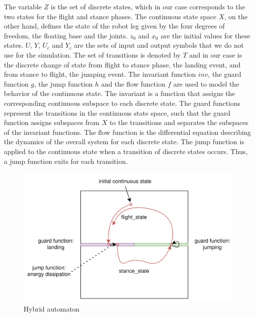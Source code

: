 \documentclass[10pt,conference]{IEEEtran}
\begin{document}
The variable $Z$ is the set of discrete states, which in our case corresponds to the two states for the flight and stance phases. The continuous state space $X$, on the other hand, defines the state of the robot leg given by the four degrees of freedom, the floating base and the joints. $z_0$ and $x_0$ are the initial values for these states. $U$, $Y$, $U_c$ and $Y_c$ are the sets of input and output symbols that we do not use for the simulation. The set of transitions is denoted by $T$ and in our case is the discrete change of state from flight to stance phase, the landing event, and  from stance to flight, the jumping event. The invariant function $inv$, the guard function $g$, the jump function $h$ and the flow function $f$ are used to model the behavior of the continuous state. The invariant is a function that assigns the corresponding continuous subspace to each discrete state.  The guard functions represent the transitions in the continuous state space, such that the guard function assigns subspaces from $X$ to the transitions and separates the subspaces of the invariant functions. The flow function is the differential equation describing the dynamics of the overall system for each discrete state. The jump function is applied to the continuous state when a transition of discrete states occurs. Thus, a jump function exits for each transition.

\begin{figure}[h]
	\centering
	\includegraphics[scale=0.17]{"assets/hybrid_automaton.png"}
	\caption{Hybrid automaton}
	\label{fig:hybrid_automaton}
\end{figure}
\end{document}
